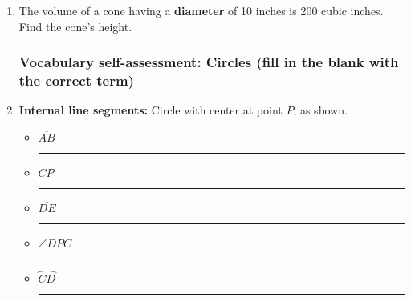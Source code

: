 \documentclass[12pt, twoside]{article}
\begin{document}
\begin{enumerate}
  \item The volume of a cone having a \textbf{diameter} of 10 inches is 200 cubic inches. Find the cone's height. \vspace{2cm}

\newpage 
\subsubsection*{Vocabulary self-assessment: Circles (fill in the blank with the correct term)}

  \item \textbf{Internal line segments:} Circle with center at point $P$, as shown.
    \begin{multicols}{2}
      \begin{itemize}
        \item  $\overline{AB}$ \quad \rule{3cm}{0.15mm} %
        \item  $\overline{CP}$ \quad \rule{3cm}{0.15mm} %
        \item  $\overline{DE}$ \quad \rule{3cm}{0.15mm} %
        \item $\angle DPC$ \quad \rule{3cm}{0.15mm} %
        \item  $\wideparen{CD}$ \quad \rule{3cm}{0.15mm} %
      \end{itemize}
  \end{multicols}


\end{enumerate}
\end{document}
